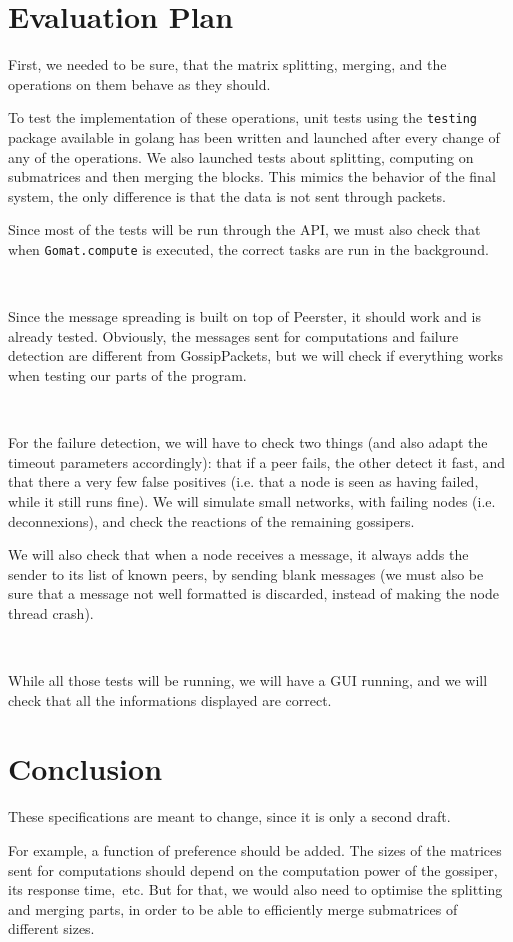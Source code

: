 \documentclass[a4paper,12pt]{article}
\begin{document}
    \section{Evaluation Plan}
    First, we needed to be sure, that the matrix splitting, merging, and the operations on them behave as they should.

    To test the implementation of these operations, unit tests using the \texttt{testing} package available in golang has been written and launched after every change of any of the operations. We also launched tests about splitting, computing on submatrices and then merging the blocks. This mimics the behavior of the final system, the only difference is that the data is not sent through packets.

    Since most of the tests will be run through the API, we must also check that when \texttt{Gomat.compute} is executed, the correct tasks are run in the background.

~~

    Since the message spreading is built on top of Peerster, it should work and is already tested. Obviously, the messages sent for computations and failure detection are different from GossipPackets, but we will check if everything works when testing our parts of the program.

~~

    For the failure detection, we will have to check two things (and also adapt the timeout parameters accordingly): that if a peer fails, the other detect it fast, and that there a very few false positives (i.e. that a node is seen as having failed, while it still runs fine). We will simulate small networks, with failing nodes (i.e. deconnexions), and check the reactions of the remaining gossipers.

    We will also check that when a node receives a message, it always adds the sender to its list of known peers, by sending blank messages (we must also be sure that a message not well formatted is discarded, instead of making the node thread crash).

~~

    While all those tests will be running, we will have a GUI running, and we will check that all the informations displayed are correct.

    \section{Conclusion}
    These specifications are meant to change, since it is only a second draft.

    For example, a function of preference should be added. The sizes of the matrices sent for computations should depend on the computation power of the gossiper, its response time,~etc. But for that, we would also need to optimise the splitting and merging parts, in order to be able to efficiently merge submatrices of different sizes.
\end{document}
